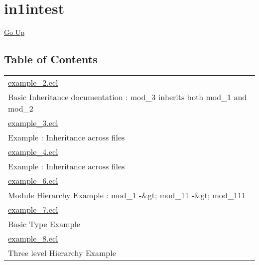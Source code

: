 \chapter*{\color{headtoc} in1intest}
\hypertarget{ecldoc:toc:root/intest/in1intest}{}
\hyperlink{ecldoc:toc:root/intest}{Go Up}


\section*{Table of Contents}
{\renewcommand{\arraystretch}{1.5}
\begin{longtable}{|p{\textwidth}|}
\hline
\hyperlink{ecldoc:toc:intest.in1intest.example_2}{example\_2.ecl} \\
Basic Inheritance documentation : mod\_3 inherits both mod\_1 and mod\_2 \\
\hline
\hyperlink{ecldoc:toc:intest.in1intest.example_3}{example\_3.ecl} \\
Example : Inheritance across files \\
\hline
\hyperlink{ecldoc:toc:intest.in1intest.example_4}{example\_4.ecl} \\
Example : Inheritance across files \\
\hline
\hyperlink{ecldoc:toc:intest.in1intest.example_6}{example\_6.ecl} \\
Module Hierarchy Example : mod\_1 -\&gt; mod\_11 -\&gt; mod\_111 \\
\hline
\hyperlink{ecldoc:toc:intest.in1intest.example_7}{example\_7.ecl} \\
Basic Type Example \\
\hline
\hyperlink{ecldoc:toc:intest.in1intest.example_8}{example\_8.ecl} \\
Three level Hierarchy Example \\
\hline
\end{longtable}
}







